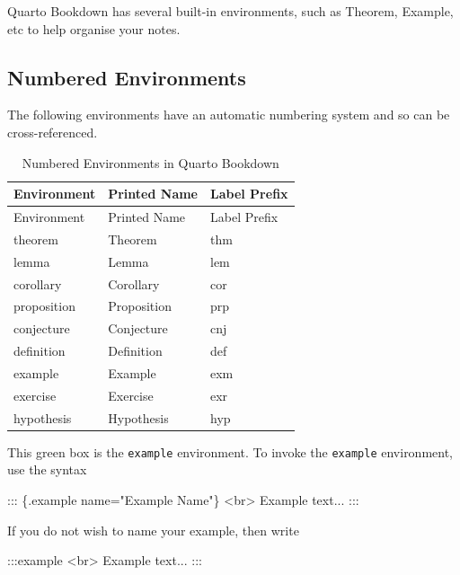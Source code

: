 \documentclass[
  letterpaper,
  oneside]{book}
\newenvironment{Shaded}{\begin{snugshade}}{\end{snugshade}}
\newcommand{\NormalTok}[1]{\textcolor[rgb]{0.00,0.23,0.31}{#1}}
\numberwithin{equation}{section}
\numberwithin{figure}{section}
\theoremstyle{break}
\theoremstyle{plain}
\theoremstyle{remark}
\begin{document}
Quarto Bookdown has several built-in environments, such as Theorem,
Example, etc to help organise your notes.

\subsection{Numbered Environments}\label{numbered-environments}

The following environments have an automatic numbering system and so can
be cross-referenced.

\begin{longtable}[]{@{}lll@{}}
\caption{Numbered Environments in Quarto
Bookdown}\label{tbl-numEnvs}\tabularnewline
\toprule\noalign{}
Environment & Printed Name & Label Prefix \\
\midrule\noalign{}
\endfirsthead
\toprule\noalign{}
Environment & Printed Name & Label Prefix \\
\midrule\noalign{}
\endhead
\bottomrule\noalign{}
\endlastfoot
theorem & Theorem & thm \\
lemma & Lemma & lem \\
corollary & Corollary & cor \\
proposition & Proposition & prp \\
conjecture & Conjecture & cnj \\
definition & Definition & def \\
example & Example & exm \\
exercise & Exercise & exr \\
hypothesis & Hypothesis & hyp \\
\end{longtable}

This green box is the \texttt{example} environment. To invoke the
\texttt{example} environment, use the syntax

\begin{Shaded}
\begin{Highlighting}[]
\NormalTok{::: \{.example name="Example Name"\}}
\NormalTok{\textless{}br\textgreater{}}
\NormalTok{Example text...}
\NormalTok{:::}
\end{Highlighting}
\end{Shaded}

If you do not wish to name your example, then write

\begin{Shaded}
\begin{Highlighting}[]
\NormalTok{:::example}
\NormalTok{\textless{}br\textgreater{}}
\NormalTok{Example text...}
\NormalTok{:::}
\end{Highlighting}
\end{Shaded}
\end{document}

